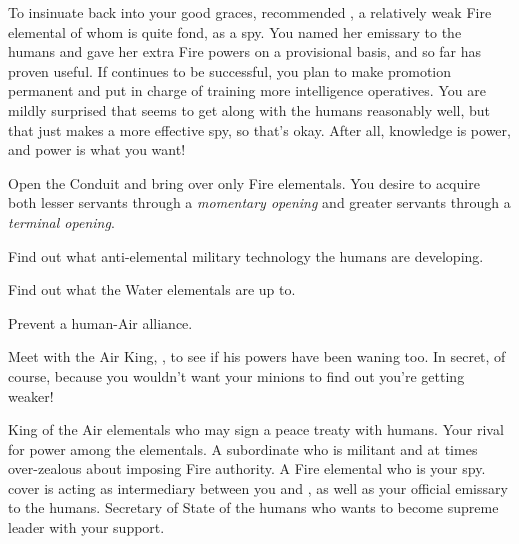 \documentclass[char]{elementals}
\begin{document}
 To insinuate \cPyro{\themself} back into your good graces, \cPyro{} recommended \cJuliet{\intro}, a relatively weak Fire elemental of whom \cPyro{} is quite fond, as a spy.  You named her emissary to the humans and gave her extra Fire powers on a provisional basis, and so far \cJuliet{\they} has proven useful.  If \cJuliet{\they} continues to be successful, you plan to make \cJuliet{\their} promotion permanent and put \cJuliet{\their} in charge of training more intelligence operatives.  You are mildly surprised that \cJuliet{\they} seems to get along with the humans reasonably well, but that just makes \cJuliet{\them} a more effective spy, so that's okay.  After all, knowledge is power, and power is what you want!




\begin{itemz}[Goals]
  \item Open the Conduit and bring over only Fire elementals. You desire to acquire both lesser servants through a \emph{momentary opening} and greater servants through a \emph{terminal opening}.
  \item Find out what anti-elemental military technology the humans are developing.
  \item Find out what the Water elementals are up to.
  \item Prevent a human-Air alliance.
  \item Meet with the Air King, \cKing{\full}, to see if his powers have been waning too.  In secret, of course, because you wouldn't want your minions to find out you're getting weaker!
\end{itemz}

\begin{contacts}
  \contact{\cKing{}} King of the Air elementals who may sign a peace treaty with humans.  Your rival for power among the elementals.
  \contact{\cPyro{}} A subordinate who is militant and at times over-zealous about imposing Fire authority.
  \contact{\cJuliet{}} A Fire elemental who is your spy.  \cJuliet{\Their} cover is acting as intermediary between you and \cKing{}, as well as your official emissary to the humans.
  \contact{\cDema{}} Secretary of State of the humans who wants to become supreme leader with your support.
\end{contacts}
\end{document}
